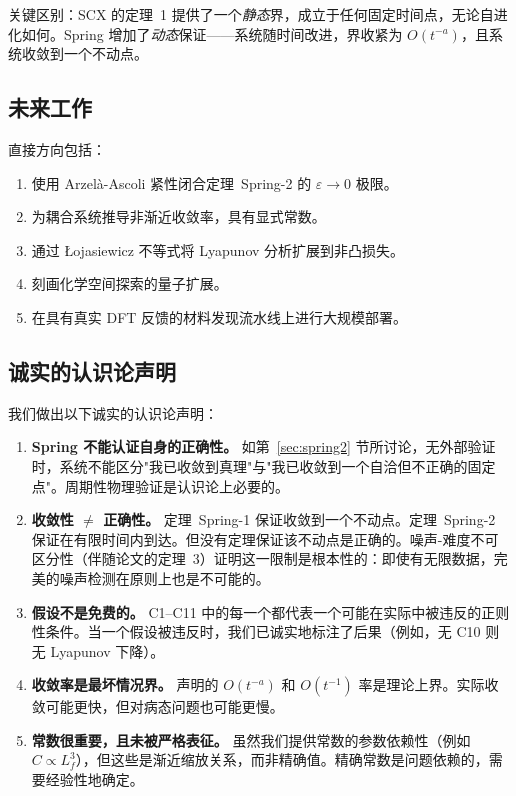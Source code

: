关键区别：SCX 的定理~1 提供了一个\textit{静态}界，成立于任何固定时间点，无论自进化如何。Spring 增加了\textit{动态}保证——系统随时间改进，界收紧为 $O(t^{-a})$，且系统收敛到一个不动点。

\subsection{未来工作}

直接方向包括：
\begin{enumerate}[nosep]
    \item 使用 Arzel\`{a}-Ascoli 紧性闭合定理~Spring-2 的 $\varepsilon \to 0$ 极限。
    \item 为耦合系统推导非渐近收敛率，具有显式常数。
    \item 通过 {\L}ojasiewicz 不等式将 Lyapunov 分析扩展到非凸损失。
    \item 刻画化学空间探索的量子扩展。
    \item 在具有真实 DFT 反馈的材料发现流水线上进行大规模部署。
\end{enumerate}

\subsection{诚实的认识论声明}

我们做出以下诚实的认识论声明：

\begin{enumerate}[nosep]
    \item \textbf{Spring 不能认证自身的正确性。} 如第~\ref{sec:spring2} 节所讨论，无外部验证时，系统不能区分"我已收敛到真理"与"我已收敛到一个自洽但不正确的固定点"。周期性物理验证是认识论上必要的。

    \item \textbf{收敛性 $\neq$ 正确性。} 定理~Spring-1 保证收敛到一个不动点。定理~Spring-2 保证在有限时间内到达。但没有定理保证该不动点是正确的。噪声-难度不可区分性（伴随论文的定理~3）证明这一限制是根本性的：即使有无限数据，完美的噪声检测在原则上也是不可能的。

    \item \textbf{假设不是免费的。} C1--C11 中的每一个都代表一个可能在实际中被违反的正则性条件。当一个假设被违反时，我们已诚实地标注了后果（例如，无 C10 则无 Lyapunov 下降）。

    \item \textbf{收敛率是最坏情况界。} 声明的 $O(t^{-a})$ 和 $O(t^{-1})$ 率是理论上界。实际收敛可能更快，但对病态问题也可能更慢。

    \item \textbf{常数很重要，且未被严格表征。} 虽然我们提供常数的参数依赖性（例如 $C \propto L_f^3$），但这些是渐近缩放关系，而非精确值。精确常数是问题依赖的，需要经验性地确定。
\end{enumerate}

